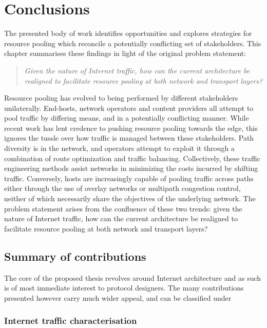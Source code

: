 \chapter{Conclusions}
\label{chapter:conclusions}

The presented body of work identifies opportunities and explores strategies for resource pooling which reconcile a potentially conflicting set of stakeholders.
\LOREM
This chapter summarises these findings in light of the original problem statement:

\begin{quote}
\textit{
Given the nature of Internet traffic, how can the current architecture be realigned to facilitate resource pooling at both network and transport layers?
}
\end{quote}


Resource pooling has evolved to being performed by different stakeholders unilaterally.
End-hosts, network operators and content providers all attempt to pool traffic by differing means, and in a potentially conflicting manner.
While recent work has lent credence to pushing resource pooling towards the edge, this ignores the tussle over how traffic is managed between these stakeholders.
Path diversity is in the network, and operators attempt to exploit it through a combination of route optimization and traffic balancing.
Collectively, these traffic engineering methods assist networks in minimizing the costs incurred by shifting traffic.
Conversely, hosts are increasingly capable of pooling traffic across paths either through the use of overlay networks or multipath congestion control, neither of which necessarily share the objectives of the underlying network.
The problem statement arises from the confluence of these two trends: given the nature of Internet traffic, how can the current architecture be realigned to facilitate resource pooling at both network and transport layers?

\section{Summary of contributions}

The core of the proposed thesis revolves around Internet architecture and as such is of most immediate interest to protocol designers.
The many contributions presented however carry much wider appeal, and can be classified under 


\subsection{Internet traffic characterisation}

